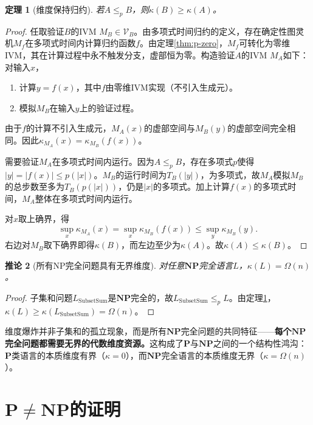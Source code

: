 \documentclass{ctexart}
\newtheorem{theorem}{定理}[section]
\newtheorem{corollary}[theorem]{推论}
\newtheorem{proof}[theorem]{证明}
\begin{document}
	\begin{theorem}[维度保持归约]\label{thm:dimension-preserving}
		若$A \le_p B$，则$\kappa(B) \ge \kappa(A)$。
	\end{theorem}
	\begin{proof}
		任取验证$B$的IVM $M_B \in \mathcal{V}_B$。由多项式时间归约的定义，存在确定性图灵机$M_f$在多项式时间内计算归约函数$f$。由定理\ref{thm:p-zero}，$M_f$可转化为零维IVM，其在计算过程中永不触发分支，虚部恒为零。构造验证$A$的IVM $M_A$如下：对输入$x$，
		\begin{enumerate}
			\item 计算$y = f(x)$，其中$f$由零维IVM实现（不引入生成元）。
			\item 模拟$M_B$在输入$y$上的验证过程。
		\end{enumerate}
		由于$f$的计算不引入生成元，$M_A(x)$的虚部空间与$M_B(y)$的虚部空间完全相同。因此$\kappa_{M_A}(x) = \kappa_{M_B}(f(x))$。
		
		需要验证$M_A$在多项式时间内运行。因为$A \le_p B$，存在多项式$p$使得$|y| = |f(x)| \le p(|x|)$。$M_B$的运行时间为$T_B(|y|)$，为多项式，故$M_A$模拟$M_B$的总步数至多为$T_B(p(|x|))$，仍是$|x|$的多项式。加上计算$f(x)$的多项式时间，$M_A$整体在多项式时间内运行。
		
		对$x$取上确界，得
		\[
		\sup_x \kappa_{M_A}(x) = \sup_x \kappa_{M_B}(f(x)) \le \sup_y \kappa_{M_B}(y).
		\]
		右边对$M_B$取下确界即得$\kappa(B)$，而左边至少为$\kappa(A)$。故$\kappa(A) \le \kappa(B)$。
	\end{proof}
	
	\begin{corollary}[所有NP完全问题具有无界维度]\label{cor:np-complete-unbounded}
		对任意$\mathbf{NP}$完全语言$L$，$\kappa(L) = \Omega(n)$。
	\end{corollary}
	\begin{proof}
		子集和问题$L_{\mathrm{SubsetSum}}$是$\mathbf{NP}$完全的，故$L_{\mathrm{SubsetSum}} \le_p L$。由定理\ref{thm:dimension-preserving}，$\kappa(L) \ge \kappa(L_{\mathrm{SubsetSum}}) = \Omega(n)$。
	\end{proof}
	
	维度爆炸并非子集和的孤立现象，而是所有$\mathbf{NP}$完全问题的共同特征——\textbf{每个$\mathbf{NP}$完全问题都需要无界的代数维度资源。}这构成了$\mathbf{P}$与$\mathbf{NP}$之间的一个结构性鸿沟：$\mathbf{P}$类语言的本质维度有界（$\kappa=0$），而$\mathbf{NP}$完全语言的本质维度无界（$\kappa=\Omega(n)$）。
	
	\section{$\mathbf{P} \neq \mathbf{NP}$的证明}
	
\end{document}
